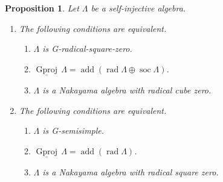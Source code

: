 \documentclass[12pt]{amsart}
\numberwithin{equation}{subsection}
\theoremstyle{plain}
\newtheorem{proposition}[theorem]{Proposition}
\theoremstyle{definition}
\newcommand{\rad}{\operatorname{rad}}
\newcommand{\soc}{\operatorname{soc}\nolimits}
\newcommand{\add}{\operatorname{add}}
\newcommand{\sGproj}{\underline{\operatorname{Gproj}}\,}
\renewcommand{\L}{\Lambda}
\begin{document}
\begin{proposition}\label{claim_25}
Let $\L$ be a self-injective algebra.
\begin{enumerate}
\item The following conditions are equivalent.
\begin{enumerate}
\item $\L$ is G-radical-square-zero.
\item $\sGproj\L=\add\left(\rad\L\oplus\soc\L\right)$.
\item  $\L$ is a Nakayama algebra with radical cube zero.
\end{enumerate}
\item The following conditions are equivalent.
\begin{enumerate}
\item $\L$ is G-semisimple.
\item $\sGproj\L=\add(\rad\L)$.
\item  $\L$ is a Nakayama algebra with radical square zero.
\end{enumerate} 
\end{enumerate}
\end{proposition} 
\end{document}
